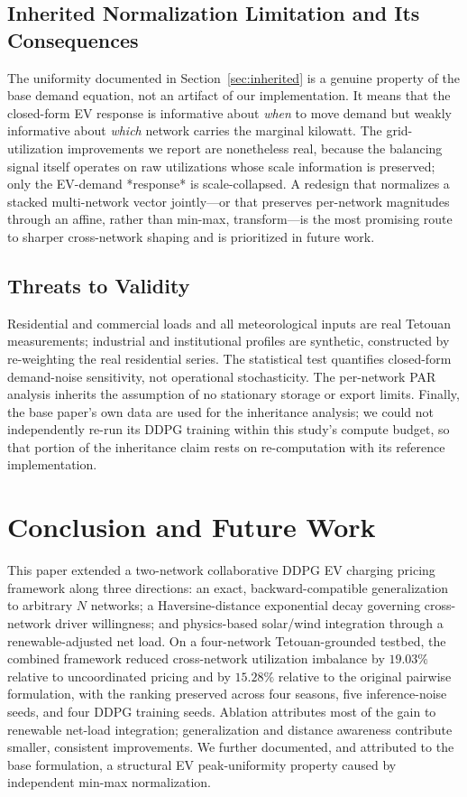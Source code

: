 \documentclass[10pt,journal]{IEEEtran}
\begin{document}
\subsection{Inherited Normalization Limitation and Its Consequences}
The uniformity documented in Section~\ref{sec:inherited} is a genuine
property of the base demand equation, not an artifact of our
implementation. It means that the closed-form EV response is informative
about \emph{when} to move demand but weakly informative about \emph{which}
network carries the marginal kilowatt. The grid-utilization improvements
we report are nonetheless real, because the balancing signal itself
operates on raw utilizations whose scale information is preserved; only the
EV-demand *response* is scale-collapsed. A redesign that normalizes a
stacked multi-network vector jointly---or that preserves per-network
magnitudes through an affine, rather than min-max, transform---is the most
promising route to sharper cross-network shaping and is prioritized in
future work.

\subsection{Threats to Validity}
Residential and commercial loads and all meteorological inputs are real
Tetouan measurements; industrial and institutional profiles are synthetic,
constructed by re-weighting the real residential series. The statistical
test quantifies closed-form demand-noise sensitivity, not operational
stochasticity. The per-network PAR analysis inherits the assumption of no
stationary storage or export limits. Finally, the base paper's own data are
used for the inheritance analysis; we could not independently re-run its
DDPG training within this study's compute budget, so that portion of the
inheritance claim rests on re-computation with its reference implementation.

\section{Conclusion and Future Work}\label{sec:conc}
This paper extended a two-network collaborative DDPG EV charging pricing
framework along three directions: an exact, backward-compatible
generalization to arbitrary $N$ networks; a Haversine-distance exponential
decay governing cross-network driver willingness; and physics-based
solar/wind integration through a renewable-adjusted net load. On a
four-network Tetouan-grounded testbed, the combined framework reduced
cross-network utilization imbalance by $19.03\%$ relative to uncoordinated
pricing and by $15.28\%$ relative to the original pairwise formulation,
with the ranking preserved across four seasons, five inference-noise seeds,
and four DDPG training seeds. Ablation attributes most of the gain to
renewable net-load integration; generalization and distance awareness
contribute smaller, consistent improvements. We further documented, and
attributed to the base formulation, a structural EV peak-uniformity
property caused by independent min-max normalization.
\end{document}
